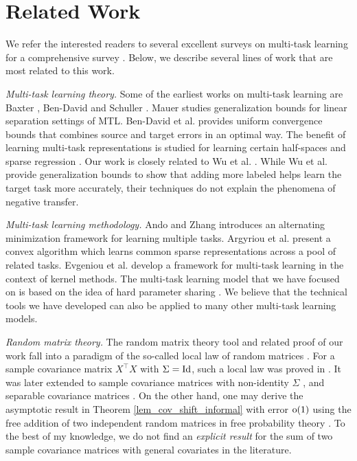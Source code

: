 \vspace{-0.05in}
\section{Related Work}
\vspace{-0.05in}

We refer the interested readers to several excellent surveys on multi-task  learning for a comprehensive survey \cite{PY09,R17,ZY17,V20}.
Below, we describe several lines of work that are most related to this work.

\textit{Multi-task learning theory.}
Some of the earliest works on multi-task learning are Baxter \cite{B00}, Ben-David and Schuller \cite{BS03}.
Mauer \cite{M06} studies generalization bounds for linear separation settings of MTL.
Ben-David et al. \cite{BBCK10} provides uniform convergence bounds that combines source and target errors in an optimal way.
The benefit of learning multi-task representations is studied for learning certain half-spaces \cite{MPR16} and sparse regression \cite{LPTV09,LPVT11}.
Our work is closely related to Wu et al. \cite{WZR20}.
While Wu et al. provide generalization bounds to show that adding more labeled helps learn the target task more accurately, their techniques do not explain the phenomena of negative transfer.

\textit{Multi-task learning methodology.}
Ando and Zhang \cite{AZ05} introduces an alternating minimization framework for learning multiple tasks.
Argyriou et al. \cite{AEP08} present a convex algorithm which learns common sparse representations across a pool of related tasks.
Evgeniou et al. \cite{EMP05} develop a framework for multi-task learning in the context of kernel methods.
The multi-task learning model that we have focused on is based on the idea of hard parameter sharing \cite{C93,KD12,R17}.
We believe that the technical tools we have developed can also be applied to many other multi-task learning models.

\textit{Random matrix theory.}
The random matrix theory tool and related proof of our work fall into a paradigm of the so-called local law of random matrices \cite{erdos2017dynamical}.
For a sample covariance matrix $X^\top X$ with $\Sigma=\operatorname{Id}$, such a local law was proved in \cite{isotropic}.
It was later extended to sample covariance matrices with non-identity $\Sigma$ \cite{Anisotropic}, and separable covariance matrices \cite{yang2019spiked}. On the other hand, one may derive the asymptotic result in Theorem \ref{lem_cov_shift_informal} with error $\operatorname{o}(1)$ using the free addition of two independent random matrices in free probability theory \cite{nica2006lectures}. To the best of my knowledge, we do not find an {\it explicit result} for the sum of two sample covariance matrices with general covariates in the literature.


